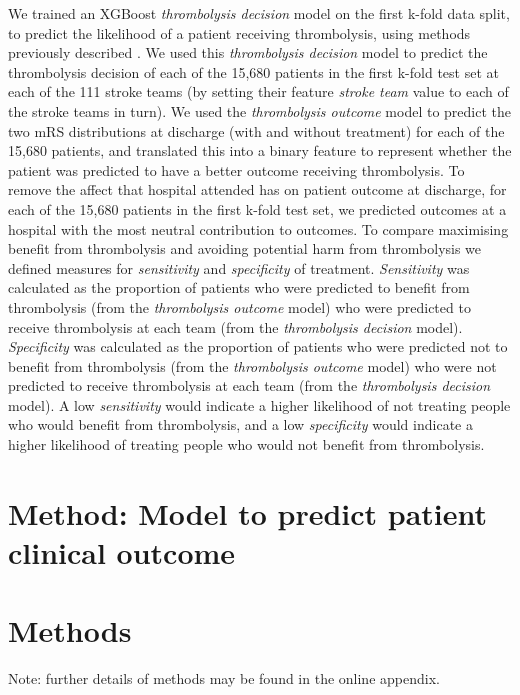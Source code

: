 We trained an XGBoost \textit{thrombolysis decision} model on the first k-fold data split, to predict the likelihood of a patient receiving thrombolysis, using methods previously described \cite{pearn_what_2023}. We used this \textit{thrombolysis decision} model to predict the thrombolysis decision of each of the 15,680 patients in the first k-fold test set at each of the 111 stroke teams (by setting their feature \textit{stroke team} value to each of the stroke teams in turn). We used the \textit{thrombolysis outcome} model to predict the two mRS distributions at discharge (with and without treatment) for each of the 15,680 patients, and translated this into a binary feature to represent whether the patient was predicted to have a better outcome receiving thrombolysis. To remove the affect that hospital attended has on patient outcome at discharge, for each of the 15,680 patients in the first k-fold test set, we predicted outcomes at a hospital with the most neutral contribution to outcomes. To compare maximising benefit from thrombolysis and avoiding potential harm from thrombolysis we defined measures for \textit{sensitivity} and \textit{specificity} of treatment. \textit{Sensitivity} was calculated as the proportion of patients who were predicted to benefit from thrombolysis (from the \textit{thrombolysis outcome} model) who were predicted to receive thrombolysis at each team (from the \textit{thrombolysis decision} model). \textit{Specificity} was calculated as the proportion of patients who were predicted not to benefit from thrombolysis (from the \textit{thrombolysis outcome} model) who were not predicted to receive thrombolysis at each team (from the \textit{thrombolysis decision} model). A low \textit{sensitivity} would indicate a higher likelihood of not treating people who would benefit from thrombolysis, and a low \textit{specificity} would indicate a higher likelihood of treating people who would not benefit from thrombolysis.


\section{Method: Model to predict patient clinical outcome}

\section{Methods}

Note: further details of methods may be found in the online appendix. 

